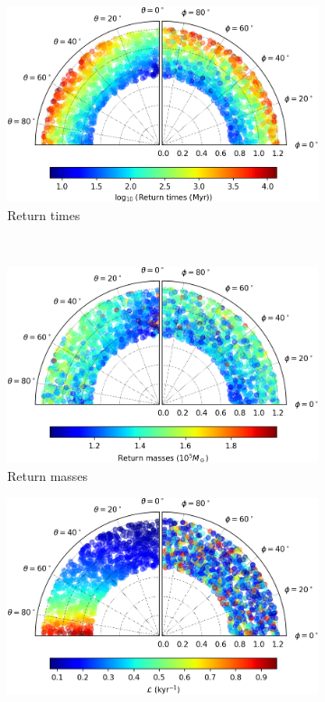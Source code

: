 \begin{figure}[h]
    \centering
    \begin{subfigure}[t]{0.4\textwidth}
        \includegraphics[width = \textwidth]{"../Files/Week 13/images/1_time"}
        \caption{Return times}
    \end{subfigure}
    ~ 
    \begin{subfigure}[t]{0.4\textwidth}
        \includegraphics[width=\textwidth]{"../Files/Week 13/images/1_mass"}
        \caption{Return masses}
    \end{subfigure}
    \begin{subfigure}[t]{0.4\textwidth}
        \includegraphics[width=\textwidth]{"../Files/Week 13/images/1_lyapunov"}

\end{subfigure}
\end{figure}
